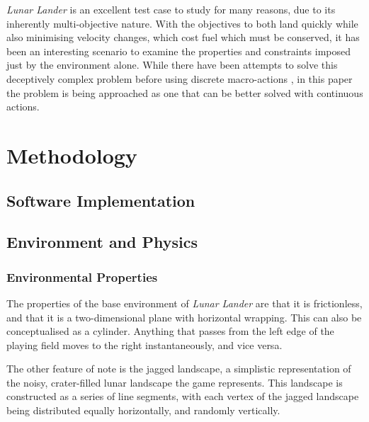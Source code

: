 \documentclass[conference]{IEEEtran}
\begin{document}
{\itshape Lunar Lander} is an excellent test case to study for many reasons, due to its inherently multi-objective nature. With the objectives to both land quickly while also minimising velocity changes, which cost fuel which must be conserved, it has been an interesting scenario to examine the properties and constraints imposed just by the environment alone. While there have been attempts to solve this deceptively complex problem before using discrete macro-actions \cite{roberts13}, in this paper the problem is being approached as one that can be better solved with continuous actions.




\section{Methodology}

\subsection{Software Implementation}



\subsection{Environment and Physics}


\subsubsection{Environmental Properties}

The properties of the base environment of {\itshape Lunar Lander} are that it is frictionless, and that it is a two-dimensional plane with horizontal wrapping. This can also be conceptualised as a cylinder. Anything that passes from the left edge of the playing field moves to the right instantaneously, and vice versa.

The other feature of note is the jagged landscape, a simplistic representation of the noisy, crater-filled lunar landscape the game represents. This landscape is constructed as a series of line segments, with each vertex of the jagged landscape being distributed equally horizontally, and randomly vertically. %
\end{document}
